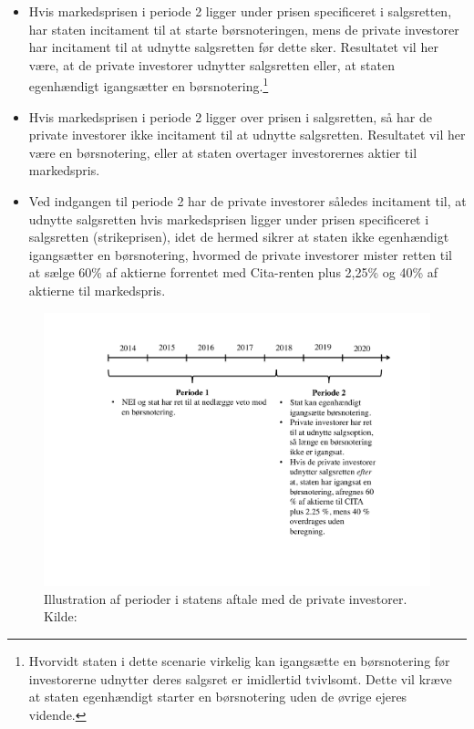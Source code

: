 \documentclass{article}
\begin{document}
\begin{itemize}
	\item Hvis markedsprisen i periode 2 ligger under prisen specificeret i salgsretten, har staten incitament til at starte børsnoteringen, mens de private investorer har incitament til at udnytte salgsretten før dette sker. Resultatet vil her være, at de private investorer udnytter salgsretten eller, at staten egenhændigt igangsætter en børsnotering.\footnote{Hvorvidt staten i dette scenarie virkelig kan igangsætte en børsnotering før investorerne udnytter deres salgsret er imidlertid tvivlsomt. Dette vil kræve at staten egenhændigt starter en børsnotering uden de øvrige ejeres vidende.}
	\item Hvis markedsprisen i periode 2 ligger over prisen i salgsretten, så har de private investorer ikke incitament til at udnytte salgsretten. Resultatet vil her være en børsnotering, eller at staten overtager investorernes aktier til markedspris.
	\item Ved indgangen til periode 2 har de private investorer således incitament til, at udnytte salgsretten hvis markedsprisen ligger under prisen specificeret i salgsretten (strikeprisen), idet de hermed sikrer at staten ikke egenhændigt igangsætter en børsnotering, hvormed de private investorer mister retten til at sælge 60\% af aktierne forrentet med Cita-renten plus 2,25\% og 40\% af aktierne til markedspris.
\end{itemize} 

\begin{figure}
\includegraphics[scale=0.6]{../figs/perioder}
\caption{Illustration af perioder i statens aftale med de private investorer. Kilde: \citet{FM2013a}}
\label{fig:perioder}
\end{figure}
\end{document}
